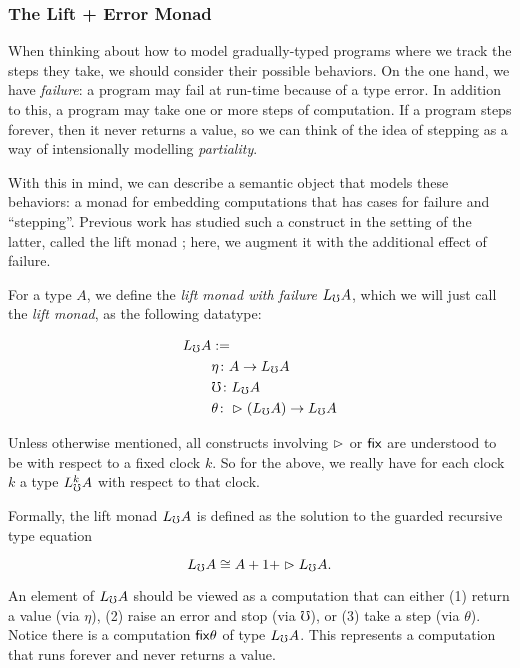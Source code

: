 \subsubsection{The Lift + Error Monad}

When thinking about how to model gradually-typed programs where we track the steps they take,
we should consider their possible behaviors. On the one hand, we have \emph{failure}: a program may fail
at run-time because of a type error. In addition to this, a program may take one or more steps of computation.
If a program steps forever, then it never returns a value,
so we can think of the idea of stepping as a way of intensionally modelling \emph{partiality}.

With this in mind, we can describe a semantic object that models these behaviors: a monad
for embedding computations that has cases for failure and ``stepping''.
Previous work has studied such a construct in the setting of the latter, called the lift
monad \cite{mogelberg-paviotti2016}; here, we augment it with the additional effect of failure.

For a type $A$, we define the \emph{lift monad with failure} $L_\mho A$, which we will just call
the \emph{lift monad}, as the following datatype:

\begin{align*}
  L_\mho A &:= \\
  &\eta \colon A \to L_\mho A \\
  &\mho \colon L_\mho A \\
  &\theta \colon \vartriangleright (L_\mho A) \to L_\mho A
\end{align*}

Unless otherwise mentioned, all constructs involving $\vartriangleright$ or $\mathsf{fix}$
are understood to be with respect to a fixed clock $k$. So for the above, we really have for each
clock $k$ a type $L_\mho^k A$ with respect to that clock.

Formally, the lift monad $L_\mho A$ is defined as the solution to the guarded recursive type equation

\[ L_\mho A \cong A + 1 + \vartriangleright L_\mho A. \]

An element of $L_\mho A$ should be viewed as a computation that can either (1) return a value (via $\eta$),
(2) raise an error and stop (via $\mho$), or (3) take a step (via $\theta$).
%
Notice there is a computation $\mathsf{fix} \theta$ of type $L_\mho A$. This represents a computation
that runs forever and never returns a value.

